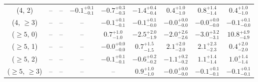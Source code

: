 \begin{table}[h!]
{\begin{tabular}{ccccccccc}
	(4, 2) & -- & -- & $-0.1^{+ 0.1 }_{- 0.1 }$ & $-0.7^{+ 0.3 }_{- 0.3 }$ & $-1.4^{+ 0.4 }_{- 0.4 }$ & $0.4^{+ 1.0 }_{- 1.0 }$ & $0.8^{+ 1.4 }_{- 1.4 }$ & $0.4^{+ 1.0 }_{- 1.0 }$ \\[0.5ex] 
	(4, $\ge3$) & -- & -- & -- & $-0.1^{+ 0.1 }_{- 0.1 }$ & $-0.1^{+ 0.1 }_{- 0.0 }$ & $-0.0^{+ 0.0 }_{- 0.0 }$ & $-0.0^{+ 0.0 }_{- 0.0 }$ & $-0.1^{+ 0.1 }_{- 0.0 }$ \\[0.5ex] 
	($\ge5$, 0) & -- & -- & -- & $0.7^{+ 1.0 }_{- 1.0 }$ & $-2.5^{+ 2.0 }_{- 1.9 }$ & $-2.0^{+ 2.6 }_{- 2.6 }$ & $-3.0^{+ 3.2 }_{- 3.1 }$ & $10.8^{+ 4.9 }_{- 4.9 }$ \\[0.5ex] 
	($\ge5$, 1) & -- & -- & -- & $-0.0^{+ 0.0 }_{- 0.0 }$ & $0.7^{+ 1.5 }_{- 1.5 }$ & $2.1^{+ 2.0 }_{- 2.0 }$ & $2.1^{+ 2.3 }_{- 2.3 }$ & $0.4^{+ 2.0 }_{- 2.0 }$ \\[0.5ex] 
	($\ge5$, 2) & -- & -- & -- & $-0.1^{+ 0.1 }_{- 0.1 }$ & $-0.6^{+ 0.2 }_{- 0.2 }$ & $-1.1^{+ 0.2 }_{- 0.2 }$ & $1.1^{+ 1.4 }_{- 1.4 }$ & $1.0^{+ 1.4 }_{- 1.4 }$ \\[0.5ex] 
	($\ge5$, $\ge3$) & -- & -- & -- & -- & $0.9^{+ 1.0 }_{- 1.0 }$ & $-0.0^{+ 0.0 }_{- 0.0 }$ & $-0.1^{+ 0.1 }_{- 0.1 }$ & $-0.1^{+ 0.1 }_{- 0.1 }$ \\[0.5ex] 
	\hline
	\hline
\end{tabular}}
\end{table}
